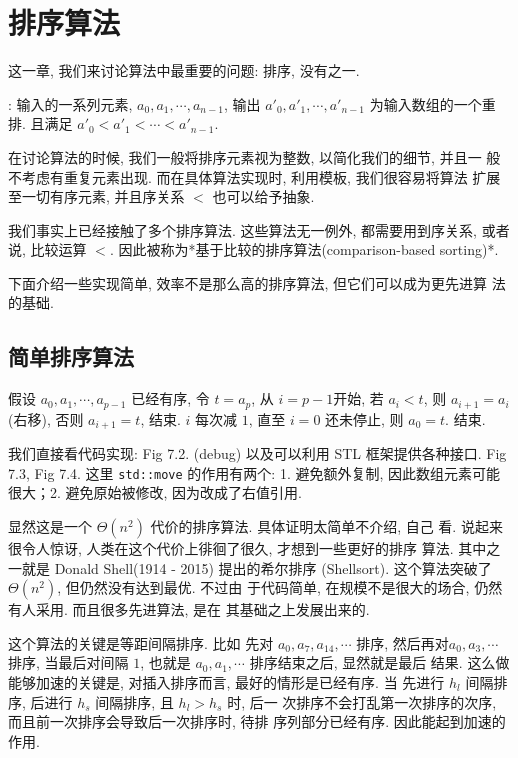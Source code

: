 \documentclass[a4paper]{ctexart}
\theoremstyle{definition}
\theoremstyle{definition}
\begin{document}

\section{排序算法}

这一章, 我们来讨论算法中最重要的问题: 排序, 没有之一. 

 : 输入的一系列元素, $a_0, a_1, \cdots,
a_{n - 1}$, 输出 $a'_0, a'_1, \cdots, a'_{n - 1}$ 为输入数组的一个重排.
且满足 $a'_0 < a'_1 < \cdots < a'_{n - 1}$.

在讨论算法的时候, 我们一般将排序元素视为整数, 以简化我们的细节, 并且一
般不考虑有重复元素出现. 而在具体算法实现时, 利用模板, 我们很容易将算法
扩展至一切有序元素, 并且序关系 $<$ 也可以给予抽象.

我们事实上已经接触了多个排序算法. 这些算法无一例外, 都需要用到序关系,
或者说, 比较运算 $<$. 因此被称为*基于比较的排序算法(comparison-based
sorting)*.

下面介绍一些实现简单, 效率不是那么高的排序算法, 但它们可以成为更先进算
法的基础.

\subsection{简单排序算法}

 假设 $a_0, a_1, \cdots, a_{p - 1}$
已经有序, 令 $t = a_{p}$, 从 $i = p - 1$开始, 若 $a_i < t$, 则 $a_{i +
  1} = a_i$(右移), 否则 $a_{i + 1} = t$, 结束.  $i$ 每次减 $1$, 直至 $i = 0$
还未停止, 则 $a_0 = t$. 结束.

我们直接看代码实现: Fig 7.2. (debug) 以及可以利用 STL 框架提供各种接口.
Fig 7.3, Fig 7.4. 这里 \verb|std::move| 的作用有两个: 1. 避免额外复制,
因此数组元素可能很大；2. 避免原始被修改, 因为改成了右值引用. 

显然这是一个 $\Theta(n^2)$ 代价的排序算法. 具体证明太简单不介绍, 自己
看. 说起来很令人惊讶, 人类在这个代价上徘徊了很久, 才想到一些更好的排序
算法. 其中之一就是 Donald Shell(1914 - 2015) 提出的希尔排序
(Shellsort). 这个算法突破了 $\Theta(n^2)$, 但仍然没有达到最优. 不过由
于代码简单, 在规模不是很大的场合, 仍然有人采用. 而且很多先进算法, 是在
其基础之上发展出来的.

 这个算法的关键是等距间隔排序. 比如
先对 $a_0, a_7, a_{14}, \cdots$ 排序, 然后再对$a_0, a_3, \cdots$ 排序,
当最后对间隔 $1$, 也就是 $a_0, a_1, \cdots$ 排序结束之后, 显然就是最后
结果. 这么做能够加速的关键是, 对插入排序而言, 最好的情形是已经有序. 当
先进行 $h_l$ 间隔排序, 后进行 $h_s$ 间隔排序, 且 $h_l > h_s$ 时, 后一
次排序不会打乱第一次排序的次序, 而且前一次排序会导致后一次排序时, 待排
序列部分已经有序. 因此能起到加速的作用.
\end{document}
